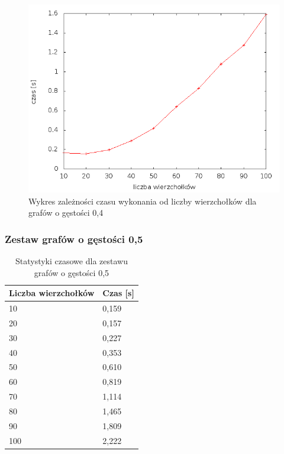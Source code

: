 \documentclass[12pt, a4paper]{article}
\begin{document}
\begin{figure}[h]
    \begin{center}
	\includegraphics[scale=0.5]{results/img/den/den_04.png}
	\caption{Wykres zależności czasu wykonania od liczby wierzchołków dla grafów o gęstości 0,4}
    \end{center}
\end{figure}

\subsubsection*{Zestaw grafów o gęstości 0,5}
\begin{table}[H]
\caption{Statystyki czasowe dla zestawu grafów o gęstości 0,5}
\begin{center}
    \begin{tabular}{|l|l|}
    \hline
    Liczba wierzchołków &  Czas [s] \\ \hline
    10 & 0,159 \\ \hline
    20 & 0,157 \\ \hline
    30 & 0,227 \\ \hline
    40 & 0,353 \\ \hline
    50 & 0,610 \\ \hline
    60 & 0,819 \\ \hline
    70 & 1,114 \\ \hline
    80 & 1,465 \\ \hline
    90 & 1,809 \\ \hline
    100 & 2,222 \\ \hline
    \end{tabular}
\end{center}
\end{table}
\end{document}
